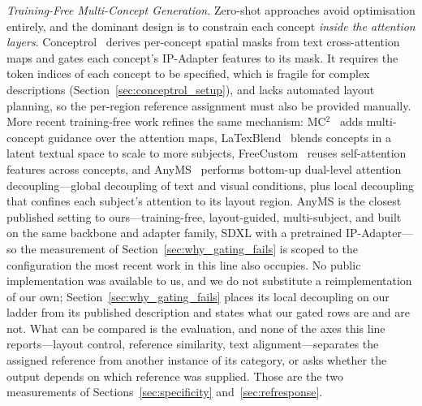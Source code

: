 \documentclass[10pt,twocolumn,letterpaper]{article}
\begin{document}
\noindent\textit{Training-Free Multi-Concept Generation.}
Zero-shot approaches avoid optimisation entirely, and the dominant design is
to constrain each concept \emph{inside the attention layers}.
Conceptrol~\cite{he2025conceptrol} derives per-concept spatial masks
from text cross-attention maps and gates each concept's IP-Adapter
features to its mask.  It requires the token indices of each concept to be
specified, which is fragile for complex descriptions (Section~\ref{sec:conceptrol_setup}),
and lacks automated layout planning, so the per-region reference assignment
must also be provided manually.
More recent training-free work refines the same mechanism:
MC$^2$~\cite{mc2_2025} adds multi-concept guidance over the attention
maps, LaTexBlend~\cite{latexblend2025} blends concepts in a latent
textual space to scale to more subjects,
FreeCustom~\cite{freecustom2024} reuses self-attention features
across concepts, and AnyMS~\cite{yu2025anyms} performs bottom-up
dual-level attention decoupling---global decoupling of text and visual
conditions, plus local decoupling that confines each subject's
attention to its layout region.
AnyMS is the closest published setting to ours---training-free,
layout-guided, multi-subject, and built on the same backbone and adapter
family, SDXL with a pretrained IP-Adapter---so the measurement of
Section~\ref{sec:why_gating_fails} is scoped to the configuration the most
recent work in this line also occupies.  No public implementation was
available to us, and we do not substitute a reimplementation of our own;
Section~\ref{sec:why_gating_fails} places its local decoupling on our ladder
from its published description and states what our gated rows are and are
not.  What can be compared is the evaluation, and none of the axes this line
reports---layout control, reference similarity, text alignment---separates the
assigned reference from another instance of its category, or asks whether the
output depends on which reference was supplied.  Those are the two
measurements of Sections~\ref{sec:specificity} and~\ref{sec:refresponse}.
\end{document}
